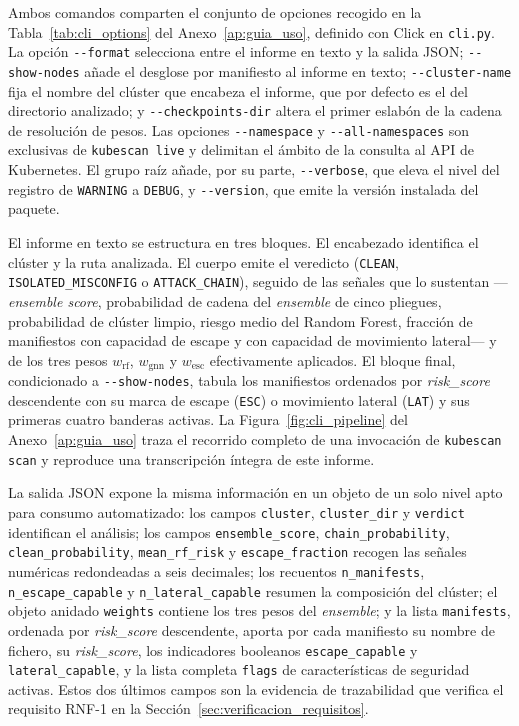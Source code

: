 Ambos comandos comparten el conjunto de opciones recogido en la
Tabla~\ref{tab:cli_options} del Anexo~\ref{ap:guia_uso}, definido con
Click en \texttt{cli.py}. La
opción \texttt{-{}-format} selecciona entre el informe en texto y la salida
\ac{JSON}; \texttt{-{}-show-nodes} añade el desglose por manifiesto al informe en
texto; \texttt{-{}-cluster-name} fija el nombre del clúster que encabeza el
informe, que por defecto es el del directorio analizado; y
\texttt{-{}-checkpoints-dir} altera el primer eslabón de la cadena de resolución de
pesos. Las opciones \texttt{-{}-namespace} y \texttt{-{}-all-namespaces} son
exclusivas de \texttt{kubescan live} y delimitan el ámbito de la consulta al
\ac{API} de Kubernetes. El grupo raíz añade, por su parte,
\texttt{-{}-verbose}, que eleva el nivel del registro de \texttt{WARNING} a
\texttt{DEBUG}, y \texttt{-{}-version}, que emite la versión instalada del paquete.

El informe en texto se estructura en tres bloques. El encabezado identifica el
clúster y la ruta analizada. El cuerpo emite el veredicto
(\texttt{CLEAN}, \texttt{ISOLATED\_MISCONFIG} o \texttt{ATTACK\_CHAIN}), seguido de
las señales que lo sustentan —\textit{ensemble score}, probabilidad de cadena del
\textit{ensemble} de cinco pliegues, probabilidad de clúster limpio, riesgo medio del Random Forest,
fracción de manifiestos con capacidad de escape y con capacidad de movimiento
lateral— y de los tres pesos \(w_{\text{rf}}\), \(w_{\text{gnn}}\) y
\(w_{\text{esc}}\) efectivamente aplicados. El bloque final, condicionado a
\texttt{-{}-show-nodes}, tabula los manifiestos ordenados por
\textit{risk\_score} descendente con su marca de escape (\texttt{ESC}) o
movimiento lateral (\texttt{LAT}) y sus primeras cuatro banderas activas. La
Figura~\ref{fig:cli_pipeline} del Anexo~\ref{ap:guia_uso} traza el recorrido
completo de una invocación de \texttt{kubescan scan} y reproduce una
transcripción íntegra de este informe.

La salida \ac{JSON} expone la misma información en un objeto de un solo nivel
apto para consumo automatizado: los campos \texttt{cluster},
\texttt{cluster\_dir} y \texttt{verdict} identifican el análisis; los campos
\texttt{ensemble\_score}, \texttt{chain\_probability},
\texttt{clean\_probability}, \texttt{mean\_rf\_risk} y \texttt{escape\_fraction}
recogen las señales numéricas redondeadas a seis decimales; los recuentos
\texttt{n\_manifests}, \texttt{n\_escape\_capable} y \texttt{n\_lateral\_capable}
resumen la composición del clúster; el objeto anidado \texttt{weights} contiene
los tres pesos del \textit{ensemble}; y la lista \texttt{manifests}, ordenada por
\textit{risk\_score} descendente, aporta por cada manifiesto su nombre de fichero,
su \textit{risk\_score}, los indicadores booleanos \texttt{escape\_capable} y
\texttt{lateral\_capable}, y la lista completa \texttt{flags} de características
de seguridad activas. Estos dos últimos campos son la evidencia de trazabilidad
que verifica el requisito RNF-1 en la
Sección~\ref{sec:verificacion_requisitos}.

